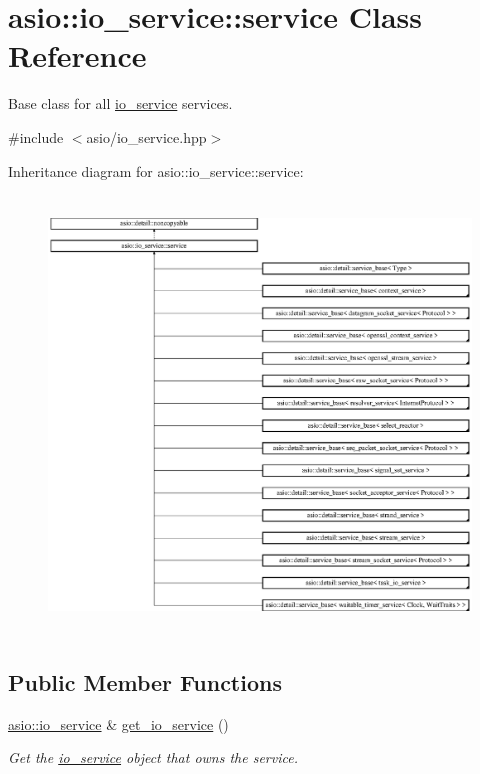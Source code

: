 \hypertarget{classasio_1_1io__service_1_1service}{}\section{asio\+:\+:io\+\_\+service\+:\+:service Class Reference}
\label{classasio_1_1io__service_1_1service}


Base class for all \hyperlink{classasio_1_1io__service}{io\+\_\+service} services.  




{\ttfamily \#include $<$asio/io\+\_\+service.\+hpp$>$}

Inheritance diagram for asio\+:\+:io\+\_\+service\+:\+:service\+:\begin{figure}[H]
\begin{center}
\leavevmode
\includegraphics[height=11.612904cm]{classasio_1_1io__service_1_1service}
\end{center}
\end{figure}
\subsection*{Public Member Functions}
\begin{DoxyCompactItemize}
\item 
\hyperlink{classasio_1_1io__service}{asio\+::io\+\_\+service} \& \hyperlink{classasio_1_1io__service_1_1service_a4f70ce5f41425e67ac1a72cfff653485}{get\+\_\+io\+\_\+service} ()
\begin{DoxyCompactList}\small\item\em Get the \hyperlink{classasio_1_1io__service}{io\+\_\+service} object that owns the service. \end{DoxyCompactList}\end{DoxyCompactItemize}
